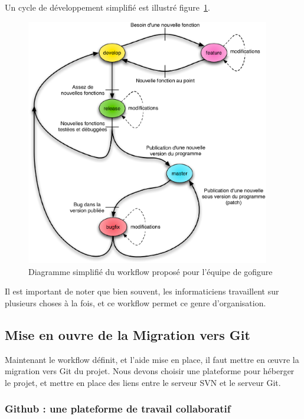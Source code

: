 Un cycle de développement simplifié est illustré figure~\ref{fig:WorkflowGitSimple}.
\begin{figure}[h]
\begin{center}
\leavevmode
\includegraphics[width=0.95\textwidth]{pictures/Git_WorkflowSimple}
\end{center}
\caption{Diagramme simplifié du workflow proposé pour l'équipe de gofigure}
\label{fig:WorkflowGitSimple}
\end{figure}
Il est important de noter que bien souvent, les informaticiens travaillent sur plusieurs choses à la fois,
et ce workflow permet ce genre d'organisation. 

\subsection{Mise en ouvre de la Migration vers Git}

Maintenant le workflow définit, et l'aide mise en place, il faut mettre en œuvre la migration vers Git du projet. Nous devons choisir une plateforme pour héberger le projet, et mettre en place des liens entre le serveur SVN et le serveur Git.

\subsubsection{Github : une plateforme de travail collaboratif}

